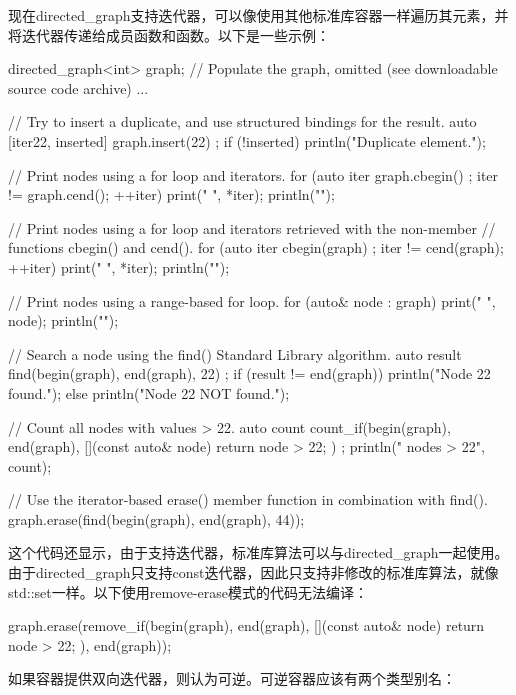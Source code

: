
现在directed\_graph支持迭代器，可以像使用其他标准库容器一样遍历其元素，并将迭代器传递给成员函数和函数。以下是一些示例：

\begin{cpp}
directed_graph<int> graph;
// Populate the graph, omitted (see downloadable source code archive) ...

// Try to insert a duplicate, and use structured bindings for the result.
auto [iter22, inserted] { graph.insert(22) };
if (!inserted) { println("Duplicate element."); }

// Print nodes using a for loop and iterators.
for (auto iter { graph.cbegin() }; iter != graph.cend(); ++iter) {
    print("{} ", *iter);
}
println("");

// Print nodes using a for loop and iterators retrieved with the non-member
// functions cbegin() and cend().
for (auto iter { cbegin(graph) }; iter != cend(graph); ++iter) {
    print("{} ", *iter);
}
println("");

// Print nodes using a range-based for loop.
for (auto& node : graph) { print("{} ", node); }
println("");

// Search a node using the find() Standard Library algorithm.
auto result { find(begin(graph), end(graph), 22) };
if (result != end(graph)) { println("Node 22 found.");}
else { println("Node 22 NOT found."); }

// Count all nodes with values > 22.
auto count { count_if(begin(graph), end(graph),
    [](const auto& node) { return node > 22; }) };
println("{} nodes > 22", count);

// Use the iterator-based erase() member function in combination with find().
graph.erase(find(begin(graph), end(graph), 44));
\end{cpp}

这个代码还显示，由于支持迭代器，标准库算法可以与directed\_graph一起使用。由于directed\_graph只支持const迭代器，因此只支持非修改的标准库算法，就像std::set一样。以下使用remove-erase模式的代码无法编译：

\begin{cpp}
graph.erase(remove_if(begin(graph), end(graph),
    [](const auto& node) { return node > 22; }), end(graph));
\end{cpp}


如果容器提供双向迭代器，则认为可逆。可逆容器应该有两个类型别名：

